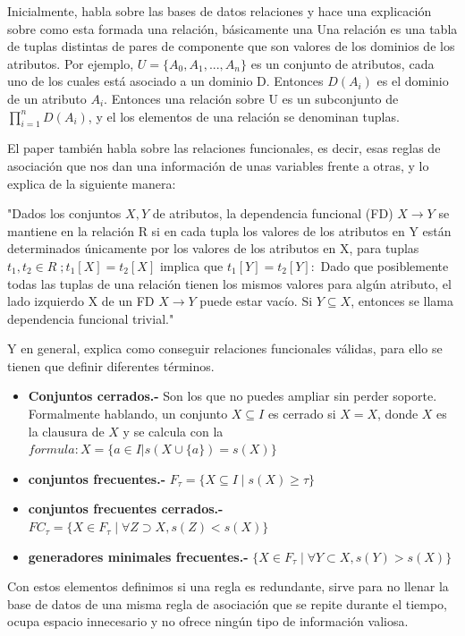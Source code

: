 \documentclass{cosas/tfg_domingo}
\begin{document}
Inicialmente, habla sobre las bases de datos relaciones y hace una explicación sobre como esta formada una relación, básicamente una
Una relación es una tabla de tuplas distintas de pares de componente que son valores de los dominios de los atributos. Por ejemplo, $U = \{A_0,A_1,...,A_n\}$ es un conjunto de atributos, cada uno de los cuales está asociado a un dominio D. Entonces $D(A_i)$ es el dominio de un atributo $A_i$. 
Entonces una relación sobre U es un subconjunto de $\prod_{i=1}^{n}D(A_i)$, y el los elementos de una relación se denominan tuplas.

El paper también habla sobre las relaciones funcionales, es decir, esas reglas de asociación que nos dan una información de unas variables frente a otras, y lo explica de la siguiente manera:

"Dados los conjuntos $ X, Y $ de atributos, la dependencia funcional (FD) $ X \rightarrow Y $ se mantiene en la relación R si en cada tupla los valores de los atributos en Y están determinados únicamente por los valores de los atributos en X, para tuplas $ t_1 , t_2 \in R \;; t_1 [X] = t_2 [X] $ implica que $ t_1 [Y] = t_2 [Y]: $ Dado que posiblemente todas las tuplas de una relación tienen los mismos valores para algún atributo, el lado izquierdo X de un FD $ X \rightarrow Y $ puede estar vacío. Si $Y \subseteq X$, entonces se llama dependencia funcional trivial."

Y en general, explica como conseguir relaciones funcionales válidas, para ello se tienen que definir diferentes términos.

\begin{itemize}
    \item \textbf{Conjuntos cerrados.-} Son los que no puedes ampliar sin perder soporte. Formalmente hablando, un conjunto $X \subseteq I$ es cerrado si $X=X$, donde $X$ es la clausura de $X$ y se calcula con la $formula :X=\{a \in I |s( X \cup\{a\}) = s(X)\}$
    
    \item \textbf{conjuntos frecuentes.-} $F_\tau=\{X \subseteq I \;|\; s(X) \geq \tau\}$
    \item \textbf{conjuntos frecuentes cerrados.-} $FC_\tau=\{X \in F_\tau \;|\; \forall Z \supset X,s(Z)<s(X)\}$
    \item \textbf{generadores minimales frecuentes.-} $\{X \in F_\tau \;|\; \forall Y \subset X,s(Y)>s(X)\}$
    
\end{itemize}

Con estos elementos definimos si una regla es redundante, sirve para no llenar la base de datos de una misma regla de asociación que se repite durante el tiempo, ocupa espacio innecesario y no ofrece ningún tipo de información valiosa.
\end{document}
